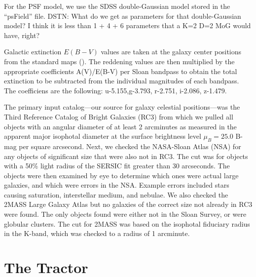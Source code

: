 \documentclass[12pt,preprint,pdftex]{aastex}
\begin{document}
For the PSF model, we use the SDSS double-Gaussian model stored in the
``psField'' file.  DSTN: What do we get as parameters for that
double-Gaussian model?  I think it is less than 1 + 4 + 6 parameters
that a K=2 D=2 MoG would have, right?

Galactic extinction $E(B-V)$ values are taken at the galaxy center
positions from the standard maps (\citealt{schlegel98}).  The
reddening values are then multiplied by the appropriate coefficients
A(V)/E(B-V) per Sloan bandpass to obtain the total extinction to be
subtracted from the individual magnitudes of each bandpass. The
coefficiens are the following: u-5.155,g-3.793, r-2.751, i-2.086,
z-1.479.

The primary input catalog---our source for galaxy
celestial positions---was the Third Reference Catalog of Bright
Galaxies (RC3) from which we pulled all objects with an angular
diameter of at least 2 arcminutes as measured in the
apparent major isophotal diameter at the surface brightness level
$\mu_B = 25.0$ B-mag per square arcsecond. Next, we checked the
NASA-Sloan Atlas (NSA) for any objects of significant size that were
also not in RC3. The cut was for objects with a 50\% light radius of
the SERSIC fit greater than 30 arcseconds. The objects were then
examined by eye to determine which ones were actual large galaxies,
and which were errors in the NSA. Example errors included stars
causing saturation, interstellar medium, and nebulae. We also checked
the 2MASS Large Galaxy Atlas but no galaxies of the correct size not
already in RC3 were found. The only objects found were either not in
the Sloan Survey, or were globular clusters. The cut for 2MASS was
based on the isophotal fiduciary radius in the K-band, which was
checked to a radius of 1 arcminute.

\section{The Tractor}
\end{document}
